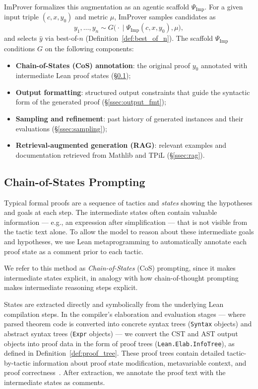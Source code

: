 ImProver formalizes this augmentation as an agentic scaffold $\Psi_{\mathrm{Imp}}$. For a given input triple $(c, x, y_0)$ and metric $\mu$, ImProver samples candidates as
\[
y_1,\dots,y_n \sim G\bigl(\cdot \;\big|\; \Psi_{\mathrm{Imp}}(c, x, y_0), \mu\bigr),
\]
and selects $\hat{y}$ via best-of-$n$ (Definition~\ref{def:best_of_n}). The scaffold $\Psi_{\mathrm{Imp}}$ conditions $G$ on the following components:
\begin{itemize}
    \item \textbf{Chain-of-States (CoS) annotation}: the original proof $y_0$ annotated with intermediate Lean proof states (\S\ref{ssec:cos_imp});
    \item \textbf{Output formatting}: structured output constraints that guide the syntactic form of the generated proof (\S\ref{ssec:output_fmt});
    \item \textbf{Sampling and refinement}: past history of generated instances and their evaluations (\S\ref{ssec:sampling});
    \item \textbf{Retrieval-augmented generation (RAG)}: relevant examples and documentation retrieved from Mathlib and TPiL (\S\ref{ssec:rag}).
\end{itemize}

\subsection{Chain-of-States Prompting}
\label{ssec:cos_imp}

Typical formal proofs are a sequence of tactics and \emph{states} showing the hypotheses and goals at each step. The intermediate states often contain valuable information --- e.g., an expression after simplification --- that is not visible from the tactic text alone. To allow the model to reason about these intermediate goals and hypotheses, we use Lean metaprogramming to automatically annotate each proof state as a comment prior to each tactic.

We refer to this method as \textit{Chain-of-States} (CoS) prompting, since it makes intermediate states explicit, in analogy with how chain-of-thought prompting~\cite{wei2022chain} makes intermediate reasoning steps explicit.

States are extracted directly and symbolically from the underlying Lean compilation steps. In the compiler's elaboration and evaluation stages --- where parsed theorem code is converted into concrete syntax trees (\texttt{Syntax} objects) and abstract syntax trees (\texttt{Expr} objects) --- we convert the CST and AST output objects into proof data in the form of proof trees (\texttt{Lean.Elab.InfoTree}), as defined in Definition~\ref{def:proof_tree}. These proof trees contain detailed tactic-by-tactic information about proof state modification, metavariable context, and proof correctness~\cite{Trainingdata}. After extraction, we annotate the proof text with the intermediate states as comments.

